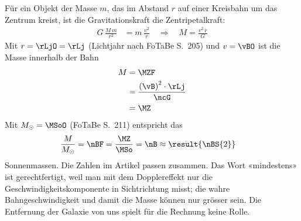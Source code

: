 \begin{center}
\end{center}

Für ein Objekt der Masse $m$, das im Abstand $r$ auf einer Kreisbahn um das Zentrum kreist, ist die Gravitationskraft die Zentripetalkraft:
\begin{align}
 G\,\frac{M\,m}{r^2} &= m\,\frac{v^2}{r}
 \quad\Rightarrow\quad M = \frac{v^2\,r}{G}
\end{align}
Mit $r = \rLjO = \rLj$ (Lichtjahr nach FoTaBe S.~205) und $v = \vBO$ ist die Masse innerhalb der Bahn
\begin{align}
 M &= \MZF \\
   &= \frac{\left(\vB\right)^2\cdot\rLj}{\ncG} \\
   &= \MZ
\end{align}
Mit $M_\odot = \MSoO$ (FoTaBe S.~211) entspricht das
\begin{align}
 \frac{M}{M_\odot} &= \nBF = \frac{\MZ}{\MSo} = \nB \approx \result{\nBS{2}}
\end{align}
Sonnenmassen. Die Zahlen im Artikel passen zusammen. Das Wort «mindestens» ist gerechtfertigt, weil man mit dem Dopplereffekt nur die Geschwindigkeitskomponente in Sichtrichtung misst; die wahre Bahngeschwindigkeit und damit die Masse können nur grösser sein. Die Entfernung der Galaxie von uns spielt für die Rechnung keine Rolle.
